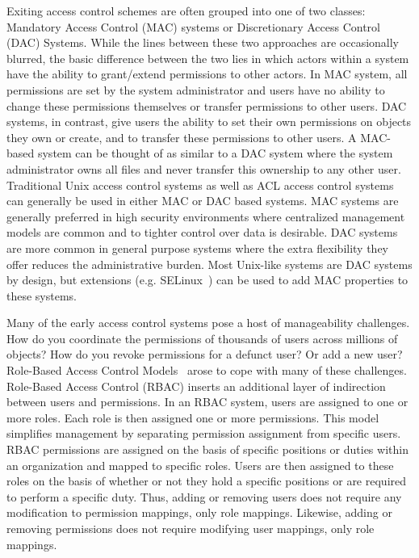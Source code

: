 Exiting access control schemes are often grouped into one of two
classes: Mandatory Access Control (MAC) systems or Discretionary
Access Control (DAC) Systems. While the lines between these two
approaches are occasionally blurred, the basic difference between the
two lies in which actors within a system have the ability to
grant/extend permissions to other actors. In MAC system, all
permissions are set by the system administrator and users have no
ability to change these permissions themselves or transfer permissions
to other users. DAC systems, in contrast, give users the ability to
set their own permissions on objects they own or create, and to
transfer these permissions to other users. A MAC-based system can be
thought of as similar to a DAC system where the system administrator
owns all files and never transfer this ownership to any other
user. Traditional Unix access control systems as well as ACL access
control systems can generally be used in either MAC or DAC based
systems. MAC systems are generally preferred in high security
environments where centralized management models are common and to
tighter control over data is desirable. DAC systems are more common in
general purpose systems where the extra flexibility they offer reduces
the administrative burden. Most Unix-like systems are DAC systems by
design, but extensions (e.g. SELinux~\cite{Loscocco2001}) can be used
to add MAC properties to these systems.

Many of the early access control systems pose a host of manageability
challenges. How do you coordinate the permissions of thousands of
users across millions of objects? How do you revoke permissions for a
defunct user? Or add a new user?  Role-Based Access Control
Models~\cite{sandhu1996} arose to cope with many of these challenges.
Role-Based Access Control (RBAC) inserts an additional layer of
indirection between users and permissions. In an RBAC system, users
are assigned to one or more roles. Each role is then assigned one or
more permissions. This model simplifies management by separating
permission assignment from specific users. RBAC permissions are
assigned on the basis of specific positions or duties within an
organization and mapped to specific roles. Users are then assigned to
these roles on the basis of whether or not they hold a specific
positions or are required to perform a specific duty. Thus, adding or
removing users does not require any modification to permission
mappings, only role mappings. Likewise, adding or removing permissions
does not require modifying user mappings, only role mappings.

